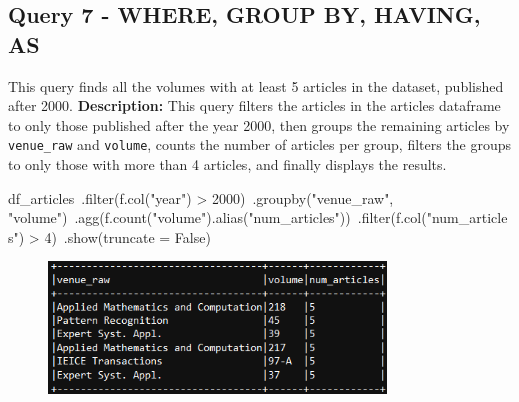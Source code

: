 \documentclass{Configuration_Files/PoliMi3i_thesis}
\begin{document}
\subsection{Query 7 - WHERE, GROUP BY, HAVING, AS}
This query finds all the volumes with at least 5 articles in the dataset, published after 2000.\newline
\textbf{Description:} This query filters the articles in the articles dataframe to only those published after the year 2000,
then groups the remaining articles by \verb|venue_raw| and \verb|volume|, counts the number of articles per group, filters the
groups to only those with more than 4 articles, and finally displays the results.\newline
\begin{python}
df_articles\
    .filter(f.col("year") > 2000)\
    .groupby("venue_raw", "volume")\
    .agg(f.count("volume").alias("num_articles"))\
    .filter(f.col("num_articles") > 4)\
    .show(truncate = False)
\end{python}
\begin{figure}[H]
\centering
\includegraphics[width=0.8\textwidth]{query/spark_q7.PNG}
\label{fig:query7}
\end{figure}
\end{document}

